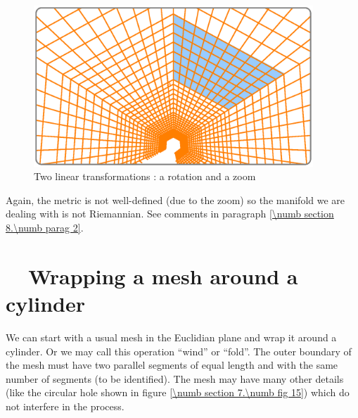 \begin{figure}[ht] \centering
  \includegraphics[width=105mm]{sector-3.eps}
  \caption{Two linear transformations : a rotation and a zoom}
  \label{\numb section 7.\numb fig 14}
\end{figure}

Again, the metric is not well-defined (due to the zoom)
so the manifold we are dealing with is not Riemannian.
See comments in paragraph \ref{\numb section 8.\numb parag 2}.


\section{~~Wrapping a mesh around a cylinder}\label{\numb section 7.\numb parag 19}

We can start with a usual mesh in the Euclidian plane and wrap it around a cylinder.
Or we may call this operation ``wind'' or ``fold''.
The outer boundary of the mesh must have two parallel segments of equal length and with
the same number of segments (to be identified).
The mesh may have many other details (like the circular hole shown in figure
\ref{\numb section 7.\numb fig 15}) which do not interfere in the process.


